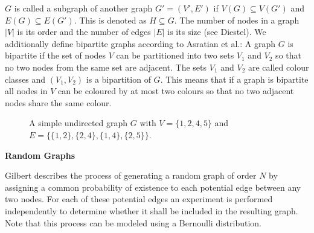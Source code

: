 $G$ is called a subgraph of another graph $G'=(V',E')$ if $V(G) \subseteq V(G')$ and $E(G) \subseteq E(G')$. This is denoted as $H \subseteq G$. The number of nodes in a graph $|V|$ is its order and the number of edges $|E|$ is its size (see Diestel\cite{Diestel2017}).
We additionally define bipartite graphs according to Asratian et al.\cite{asratian1998}: A graph $G$ is bipartite if the set of nodes $V$ can be partitioned into two sets $V_1$ and $V_2$ so that no two nodes from the same set are adjacent. The sets $V_1$ and $V_2$ are called colour classes and $(V_1, V_2)$ is a bipartition of $G$. This means that if a graph is bipartite all nodes in $V$ can be coloured by at most two colours so that no two adjacent nodes share the same colour.\\
\begin{figure}[h]
    \centering
    \caption{A simple undirected graph $G$ with $V=\{1,2,4,5\}$ and $E=\{\{1,2\},\{2,4\},\{1,4\},\{2,5\}\}$.}
    \label{fig:graph-example}
\end{figure}

\textbf{Random Graphs}
\label{sec:random-graphs}

Gilbert\cite{gilbert1959random} describes the process of generating a random graph of order $N$ by assigning a common probability of existence to each potential edge between any two nodes. For each of these potential edges an experiment is performed independently to determine whether it shall be included in the resulting graph. Note that this process can be modeled using a Bernoulli distribution.

